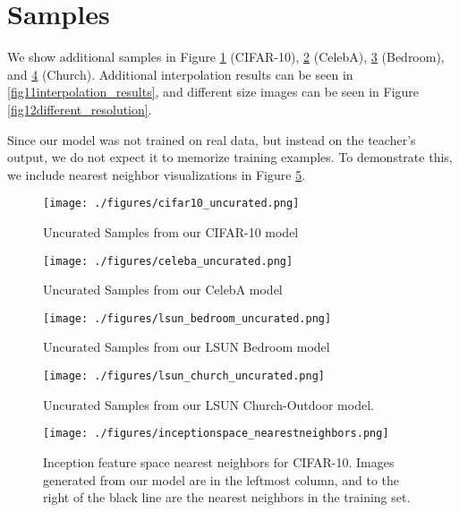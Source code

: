 \documentclass[12pt,a4paper]{article}
\begin{document}
\pagebreak

\printbibliography

\appendix

\section{Samples}
We show additional samples in Figure \ref{fig6cifar_uncurated} (CIFAR-10), \ref{fig7celeba_uncurated} (CelebA), \ref{fig8lsun_bedroom_uncurated} (Bedroom), and  \ref{fig9lsun_church_uncurated} (Church). Additional interpolation results can be seen in \ref{fig11interpolation_results}, and different size images can be seen in Figure \ref{fig12different_resolution}.

Since our model was not trained on real data, but instead on the teacher's output, we do not expect it to memorize training examples. To demonstrate this, we include nearest neighbor visualizations in Figure \ref{fig10inceptionspace_nearestneighbors}. 

\begin{figure}[H] 
\centering
\texttt{[image: ./figures/cifar10\_uncurated.png]}
\caption{Uncurated Samples from our CIFAR-10 model}
\label{fig6cifar_uncurated}
\end{figure}

\begin{figure}[H] 
\centering
\texttt{[image: ./figures/celeba\_uncurated.png]}
\caption{Uncurated Samples from our CelebA model}
\label{fig7celeba_uncurated}
\end{figure}

\begin{figure}[H] 
\centering
\texttt{[image: ./figures/lsun\_bedroom\_uncurated.png]}
\caption{Uncurated Samples from our LSUN Bedroom model}
\label{fig8lsun_bedroom_uncurated}
\end{figure}

\begin{figure}[H] 
\centering
\texttt{[image: ./figures/lsun\_church\_uncurated.png]}
\caption{Uncurated Samples from our LSUN Church-Outdoor model.}
\label{fig9lsun_church_uncurated}
\end{figure}

\begin{figure}[H] 
\centering
\texttt{[image: ./figures/inceptionspace\_nearestneighbors.png]}
\caption{Inception feature space nearest neighbors for CIFAR-10. Images generated from our model are in the leftmost column, and to the right of the black line are the nearest neighbors in the training set.}
\label{fig10inceptionspace_nearestneighbors}
\end{figure}
\end{document}
